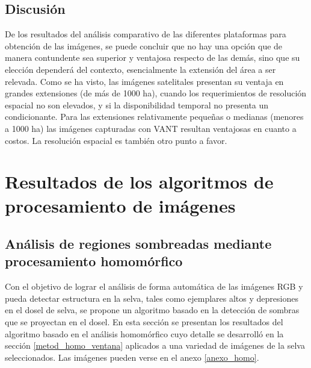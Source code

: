 \subsection{Discusión}
De los resultados del análisis comparativo de las diferentes plataformas para obtención de las imágenes, se puede concluir que no hay una opción que de manera contundente sea superior y ventajosa respecto de las demás, sino que su elección dependerá del contexto, esencialmente la extensión del área a ser relevada. Como se ha visto, las imágenes satelitales presentan su ventaja en grandes extensiones (de más de 1000 ha), cuando los requerimientos de resolución espacial no son elevados, y si la disponibilidad temporal no presenta un condicionante. Para las extensiones relativamente pequeñas o medianas (menores a 1000 ha) las imágenes capturadas con VANT resultan ventajosas en cuanto a costos. La resolución espacial es también otro punto a favor.
\section{Resultados de los algoritmos de procesamiento de imágenes}
\subsection{Análisis de regiones sombreadas mediante procesamiento homomórfico} \label{resultados homo}
Con el objetivo de lograr el análisis de forma automática de las imágenes RGB y pueda detectar estructura en la selva, tales como ejemplares altos y depresiones en el dosel de selva, se propone un algoritmo basado en la detección de sombras que se proyectan en el dosel. En esta sección se presentan los resultados del algoritmo basado en el análisis homomórfico cuyo detalle se desarrolló en la sección \ref{metod_homo_ventana} aplicados a una variedad de imágenes de la selva seleccionados. Las imágenes pueden verse en el anexo \ref{anexo_homo}.\\

